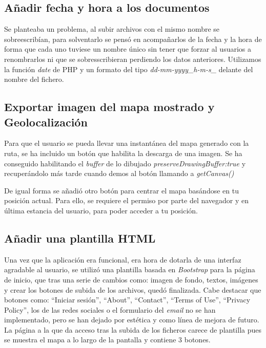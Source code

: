 \subsection{Añadir fecha y hora a los documentos}
Se planteaba un problema, al subir archivos con el mismo nombre se sobreescribían, para solventarlo se pensó en acompañarlos de la fecha y la hora de forma que cada uno tuviese un nombre único sin tener que forzar al usuarios a renombrarlos ni que se sobresscribieran perdiendo los datos anteriores. Utilizamos la función \textit{date} de PHP y un formato del tipo \textit{dd-mm-yyyy\_h-m-s\_} delante del nombre del fichero.

\subsection{Exportar imagen del mapa mostrado y Geolocalización}
Para que el usuario se pueda llevar una instantánea del mapa generado con la ruta, se ha incluido un botón que habilita la descarga de una imagen. Se ha conseguido habilitando el \textit{buffer} de lo dibujado \textit{preserveDrawingBuffer:true} y recuperándolo más tarde cuando demos al botón llamando a \textit{getCanvas()} \cite{descargaimagen}

De igual forma se añadió otro botón para centrar el mapa basándose en tu posición actual. Para ello, se requiere el permiso por parte del navegador y en última estancia del usuario, para poder acceder a tu posición.

\subsection{Añadir una plantilla HTML}
Una vez que la aplicación era funcional, era hora de dotarla de una interfaz agradable al usuario, se utilizó una plantilla basada en \textit{Bootstrap} \cite{plantilla} para la página de inicio, que tras una serie de cambios como: imagen de fondo, textos, imágenes y crear los botones de subida de los archivos, quedó finalizada. Cabe destacar que botones como: ``Iniciar sesión'', ``About'', ``Contact'', ``Terms of Use'', ``Privacy Policy'', los de las redes sociales o el formulario del \textit{email} no se han implementado, pero se han dejado por estética y como línea de mejora de futuro. La página a la que da acceso tras la subida de los ficheros carece de plantilla pues se muestra el mapa a lo largo de la pantalla y contiene 3 botones.

